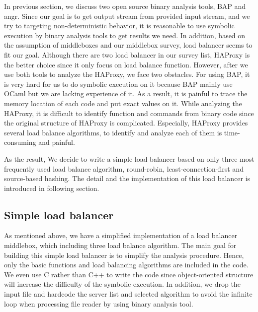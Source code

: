 In previous section, we discuss two open source binary analysis tools, BAP and
angr.  Since our goal is to get output stream from provided input stream, and we
try to targeting non-deterministic behavior, it is reasonable to use symbolic
execution by binary analysis tools to get results we need.  In addition, based
on the assumption of middleboxes and our middlebox survey, load balancer seems
to fit our goal.  Although there are two load balancer in our survey list,
HAProxy is the better choice since it only focus on load balance function.
However, after we use both tools to analyze the HAProxy, we face two obstacles.
\ci For using BAP, it is very hard for us to do symbolic execution on it because
BAP mainly use OCaml but we are lacking experience of it.  As a result, it is painful
to trace the memory location of each code and put exact values on it.  \cii
While analyzing the HAProxy, it is difficult to identify function and commands
from binary code since the original structure of HAProxy is complicated.
Especially, HAProxy provides several load balance algorithms, to identify and
analyze each of them is time-consuming and painful.

As the result, We decide to write a simple load balancer based on only three
most frequently used load balance algorithm, \ca round-robin, \cb
least-connection-first and \cc source-based hashing.  The detail and the
implementation of this load balancer is introduced in following section.

\subsection{Simple load balancer}

As mentioned above, we have a simplified implementation of a load balancer
middlebox, which including three load balance algorithm.  The main goal for
building this simple load balancer is to simplify the analysis procedure.  Hence,
only the basic functions and load balancing algorithms are included in the code.
We even use C rather than C++ to write the code since object-oriented structure
will increase the difficulty of the symbolic execution.  In addition, we drop
the input file and hardcode the server list and selected algorithm to avoid the
infinite loop when processing file reader by using binary analysis tool.

